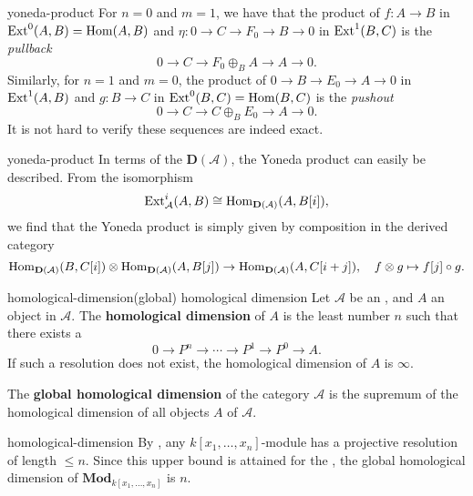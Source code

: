 \begin{example}{yoneda-product}
    For $n = 0$ and $m = 1$, we have that the product of $f : A \to B$ in $\textup{Ext}^0(A, B) = \operatorname{Hom}(A, B)$ and $\eta : 0 \to C \to F_0 \to B \to 0$ in $\textup{Ext}^1(B, C)$ is the \textit{pullback}
    \[ 0 \to C \to F_0 \oplus_B A \to A \to 0 . \]
    Similarly, for $n = 1$ and $m = 0$, the product of $0 \to B \to E_0 \to A \to 0$ in $\textup{Ext}^1(A, B)$ and $g : B \to C$ in $\textup{Ext}^0(B, C) = \operatorname{Hom}(B, C)$ is the \textit{pushout}
    \[ 0 \to C \to C \oplus_B E_0 \to A \to 0 . \]
    It is not hard to verify these sequences are indeed exact. 
\end{example}

\begin{example}{yoneda-product}
    In terms of the  $\textbf{D}(\mathcal{A})$, the Yoneda product can easily be described. From the isomorphism
    \[ \textup{Ext}^i_\mathcal{A}(A, B) \cong \operatorname{Hom}_{\textbf{D}(\mathcal{A})}(A, B[i]), \]
    we find that the Yoneda product is simply given by composition in the derived category
    \[ \operatorname{Hom}_{\textbf{D}(\mathcal{A})}(B, C[i]) \otimes \operatorname{Hom}_{\textbf{D}(\mathcal{A})}(A, B[j]) \to \operatorname{Hom}_{\textbf{D}(\mathcal{A})}(A, C[i + j]), \quad f \otimes g \mapsto f[j] \circ g . \]
\end{example}

\begin{topic}{homological-dimension}{(global) homological dimension}
    Let $\mathcal{A}$ be an , and $A$ an object in $\mathcal{A}$. The \textbf{homological dimension} of $A$ is the least number $n$ such that there exists a 
    \[ 0 \to P^n \to \cdots \to P^1 \to P^0 \to A . \]
    If such a resolution does not exist, the homological dimension of $A$ is $\infty$.
    
    The \textbf{global homological dimension} of the category $\mathcal{A}$ is the supremum of the homological dimension of all objects $A$ of $\mathcal{A}$.
\end{topic}

\begin{example}{homological-dimension}
    By , any $k[x_1, \ldots, x_n]$-module has a projective resolution of length $\le n$. Since this upper bound is attained for the , the global homological dimension of $\textbf{Mod}_{k[x_1, \ldots, x_n]}$ is $n$.
\end{example}

